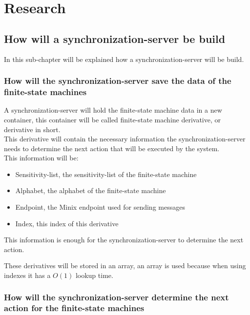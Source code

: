 \hypertarget{research}{%
\chapter{Research}\label{research}}

\hypertarget{how-will-a-synchronization-server-be-build}{%
\section{How will a synchronization-server be
build}\label{how-will-a-synchronization-server-be-build}}

In this sub-chapter will be explained how a synchronization-server will
be build.

\hypertarget{how-will-the-synchronization-server-save-the-data-of-the-finite-state-machines}{%
\subsection{How will the synchronization-server save the data of the
finite-state
machines}\label{how-will-the-synchronization-server-save-the-data-of-the-finite-state-machines}}

A synchronization-server will hold the finite-state machine data in a
new container, this container will be called finite-state machine
derivative, or derivative in short.\\
This derivative will contain the necessary information the
synchronization-server needs to determine the next action that will be
executed by the system.\\
This information will be:

\begin{itemize}
\tightlist
\item
  Sensitivity-list, the sensitivity-list of the finite-state machine
\item
  Alphabet, the alphabet of the finite-state machine
\item
  Endpoint, the Minix endpoint used for sending messages
\item
  Index, this index of this derivative
\end{itemize}

This information is enough for the synchronization-server to determine
the next action.

These derivatives will be stored in an array, an array is used because
when using indexes it has a \(O (1)\) lookup time.

\hypertarget{how-will-the-synchronization-server-determine-the-next-action-for-the-finite-state-machines}{%
\subsection{How will the synchronization-server determine the next
action for the finite-state
machines}\label{how-will-the-synchronization-server-determine-the-next-action-for-the-finite-state-machines}}

